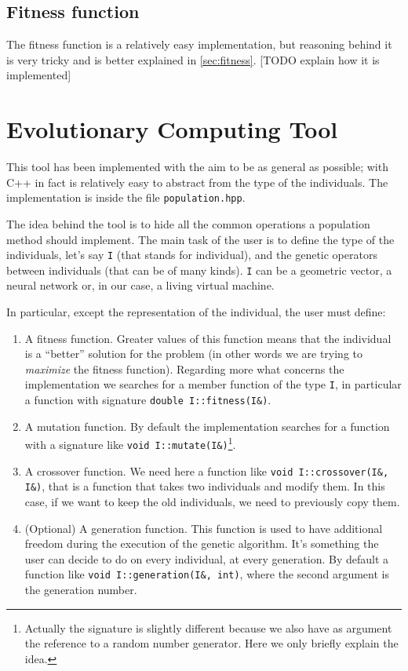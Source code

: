 \documentclass{report}
\begin{document}
\subsection{Fitness function}
\label{sec:fit}
The fitness function is a relatively easy implementation, but reasoning behind it is very tricky and is better explained in \ref{sec:fitness}.
[TODO explain how it is implemented]

\section{Evolutionary Computing Tool}
This tool has been implemented with the aim to be as general as possible; with C++ in fact is relatively easy to abstract from the type of the individuals. The implementation is inside the file \texttt{population.hpp}.

The idea behind the tool is to hide all the common operations a population method should implement. The main task of the user is to define the type of the individuals, let's say \texttt{I} (that stands for individual), and the genetic operators between individuals (that can be of many kinds). \texttt{I} can be a geometric vector, a neural network or, in our case, a living virtual machine.

In particular, except the representation of the individual, the user must define:

\begin{enumerate}
\item A fitness function. Greater values of this function means that the individual is a ``better'' solution for the problem (in other words we are trying to \textit{maximize} the fitness function). Regarding more what concerns the implementation we searches for a member function of the type \texttt{I}, in particular a function with signature \texttt{double I::fitness(I\&)}.

\item A mutation function. By default the implementation searches for a function with a signature like \texttt{void I::mutate(I\&)}\footnote{Actually the signature is slightly different because we also have as argument the reference to a random number generator. Here we only briefly explain the idea.}.

\item A crossover function. We need here a function like \texttt{void I::crossover(I\&, I\&)}, that is a function that takes two individuals and modify them. In this case, if we want to keep the old individuals, we need to previously copy them.

\item (Optional) A generation function. This function is used to have additional freedom during the execution of the genetic algorithm. It's something the user can decide to do on every individual, at every generation. By default a function like \texttt{void I::generation(I\&, int)}, where the second argument is the generation number.
\end{enumerate}
\end{document}

